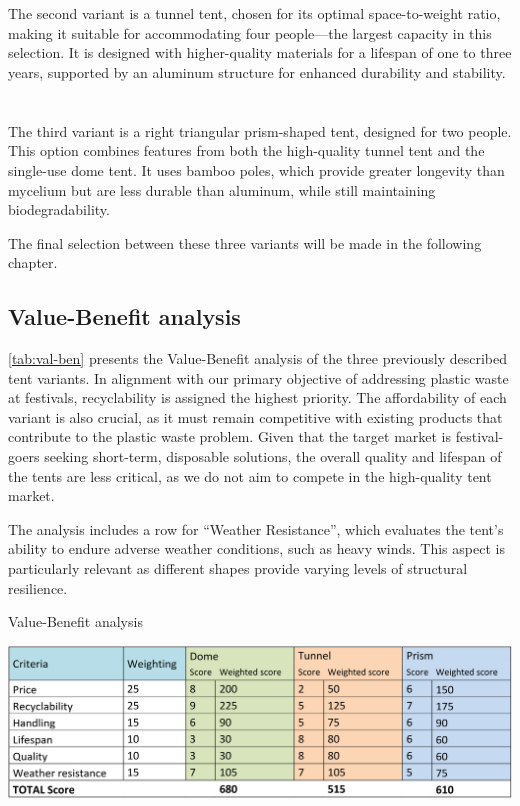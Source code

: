 \documentclass{article}
\newcommand{\pph}[1]{\paragraph{#1} \phantom{}\\}
\begin{document}
\pph{\color{neworange}{Variant 2: Tunner tent (Four-person, Long-lasting)}}
The second variant is a tunnel tent, chosen for its optimal space-to-weight ratio, making it
suitable for accommodating four people—the largest capacity in this selection. It is designed
with higher-quality materials for a lifespan of one to three years, supported by an aluminum
structure for enhanced durability and stability.

\pph{\color{newblue}{Variant 3: Triangular prism tent (Two-person, Medium-lasting)}}
The third variant is a right triangular prism-shaped tent, designed for two people. This option
combines features from both the high-quality tunnel tent and the single-use dome tent. It
uses bamboo poles, which provide greater longevity than mycelium but are less durable
than aluminum, while still maintaining biodegradability.

The final selection between these three variants will be made in the following chapter.

\subsection{Value-Benefit analysis}
\autoref{tab:val-ben} presents the Value-Benefit analysis of the three previously described tent variants. In
alignment with our primary objective of addressing plastic waste at festivals, recyclability is
assigned the highest priority. The affordability of each variant is also crucial, as it must remain
competitive with existing products that contribute to the plastic waste problem. Given that
the target market is festival-goers seeking short-term, disposable solutions, the overall quality
and lifespan of the tents are less critical, as we do not aim to compete in the high-quality tent
market.

The analysis includes a row for ``Weather Resistance'', which evaluates the tent's ability to
endure adverse weather conditions, such as heavy winds. This aspect is particularly relevant
as different shapes provide varying levels of structural resilience.

\begin{table}[ht!]
    \centering
    \caption{Value-Benefit analysis}
    \includegraphics[width=.85\textwidth]{media/val-ben.png}
    \label{tab:val-ben}
\end{table}
\end{document}
